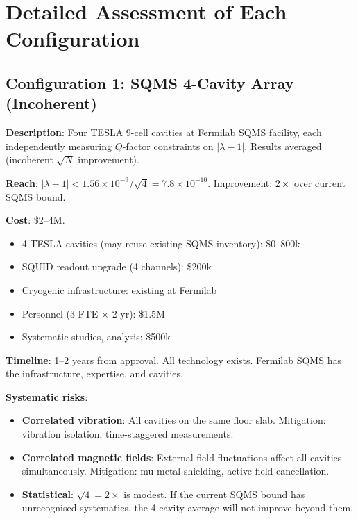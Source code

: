 \documentclass[11pt]{article}
\theoremstyle{definition}
\theoremstyle{remark}
\newcommand{\ee}[1]{\times 10^{#1}}
\newcommand{\lamdiff}{|\lambda-1|}
\begin{document}
\section{Detailed Assessment of Each Configuration}
\label{sec:detailed_assessment}

\subsection{Configuration 1: SQMS 4-Cavity Array (Incoherent)}

\begin{tcolorbox}[colback=green!5!white, colframe=green!50!black,
  title=\textbf{RECOMMENDED FIRST EXPERIMENT}]

\textbf{Description}: Four TESLA 9-cell cavities at Fermilab SQMS
facility, each independently measuring $Q$-factor constraints on
$\lamdiff$. Results averaged (incoherent $\sqrt{N}$ improvement).

\textbf{Reach}: $\lamdiff < 1.56\ee{-9}/\sqrt{4} = 7.8\ee{-10}$.
Improvement: $2\times$ over current SQMS bound.

\textbf{Cost}: \$2--4M.
\begin{itemize}[nosep]
\item 4 TESLA cavities (may reuse existing SQMS inventory): \$0--800k
\item SQUID readout upgrade (4 channels): \$200k
\item Cryogenic infrastructure: existing at Fermilab
\item Personnel (3 FTE $\times$ 2 yr): \$1.5M
\item Systematic studies, analysis: \$500k
\end{itemize}

\textbf{Timeline}: 1--2 years from approval. All technology exists.
Fermilab SQMS has the infrastructure, expertise, and cavities.

\textbf{Systematic risks}:
\begin{itemize}[nosep]
\item \textbf{Correlated vibration}: All cavities on the same floor slab.
  Mitigation: vibration isolation, time-staggered measurements.
\item \textbf{Correlated magnetic fields}: External field fluctuations
  affect all cavities simultaneously. Mitigation: mu-metal shielding,
  active field cancellation.
\item \textbf{Statistical}: $\sqrt{4} = 2\times$ is modest. If the current
  SQMS bound has unrecognised systematics, the 4-cavity average will not
  improve beyond them.
\end{itemize}


\end{tcolorbox}
\end{document}
